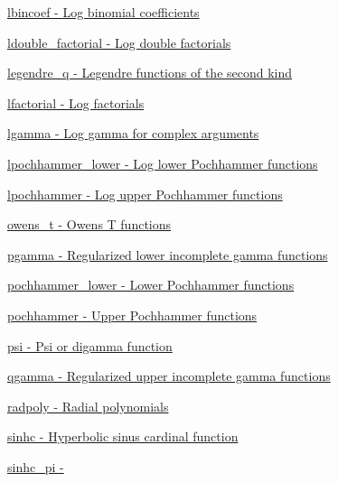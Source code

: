 \begin{DoxyItemize}
\item \hyperlink{group__gnu__math__spec__func_gab6a2243313b6286cbd466c96fc7f69ed}{lbincoef -\/ Log binomial coefficients}
\item \hyperlink{group__gnu__math__spec__func_ga31ca8e7a5b1f5c883e727ed9c053edd8}{ldouble\+\_\+factorial -\/ Log double factorials}
\item \hyperlink{group__gnu__math__spec__func_ga4ad68133a4ff354cb99e4d3608ce6e4d}{legendre\+\_\+q -\/ Legendre functions of the second kind}
\item \hyperlink{group__gnu__math__spec__func_gaee28cc03db944a3e02fd10542016cfa8}{lfactorial -\/ Log factorials}
\item \hyperlink{group__gnu__math__spec__func_ga3a5c8ad2a513470bd71be1bb14439945}{lgamma -\/ Log gamma for complex arguments}
\item \hyperlink{group__gnu__math__spec__func_ga4975d412b8e15f499a4da7b4e3f535c6}{lpochhammer\+\_\+lower -\/ Log lower Pochhammer functions}
\item \hyperlink{group__gnu__math__spec__func_ga68c4a9e8b38757a21ac54c55fe4e8dda}{lpochhammer -\/ Log upper Pochhammer functions}
\item \hyperlink{group__gnu__math__spec__func_gaa6ca4f2127c6c2101dc360673304cc2c}{owens\+\_\+t -\/ Owens T functions}
\item \hyperlink{group__gnu__math__spec__func_gaa78927de2c62e6c63f4b3506f5e1a8f6}{pgamma -\/ Regularized lower incomplete gamma functions}
\item \hyperlink{group__gnu__math__spec__func_ga306d65eeea07613a777f506ffadac509}{pochhammer\+\_\+lower -\/ Lower Pochhammer functions}
\item \hyperlink{group__gnu__math__spec__func_ga77878c3e202c7ec3d857c3fbf661001e}{pochhammer -\/ Upper Pochhammer functions}
\item \hyperlink{group__gnu__math__spec__func_gaae7574990cdbb6a637d39c2c036928c0}{psi -\/ Psi or digamma function}
\item \hyperlink{group__gnu__math__spec__func_ga3ef7aeaa55f9e7b02f02d1d605a716a6}{qgamma -\/ Regularized upper incomplete gamma functions}
\item \hyperlink{group__gnu__math__spec__func_gac44ad9bda660a21a6b297d313f0ecf48}{radpoly -\/ Radial polynomials}
\item \hyperlink{group__gnu__math__spec__func_gabafa26d8a2e592a0e080beae71ccbb7e}{sinhc -\/ Hyperbolic sinus cardinal function}
\item \hyperlink{group__gnu__math__spec__func_ga56bea42a4701761e82567f7100d9ca5e}{sinhc\+\_\+pi -\/ }

\end{DoxyItemize}
